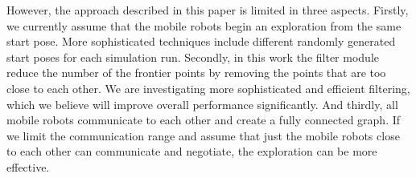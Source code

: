 \documentclass[letterpaper, 10 pt, conference]{ieeeconf}  %
\begin{document}
However, the approach described in this paper is limited in three aspects. Firstly, we currently assume that the mobile robots begin an exploration from the same start pose. More sophisticated techniques include different randomly generated start poses for each simulation run. Secondly, in this work the filter module reduce the number of the frontier points by removing the points that are too close to each other. We are investigating more sophisticated and efficient filtering, which we believe will improve overall performance significantly. And thirdly, all mobile robots communicate to each other and create a fully connected graph. If we limit the communication range and assume that just the mobile robots close to each other can communicate and negotiate, the exploration can be more effective. 

\addtolength{\textheight}{-12cm}   %
\end{document}
